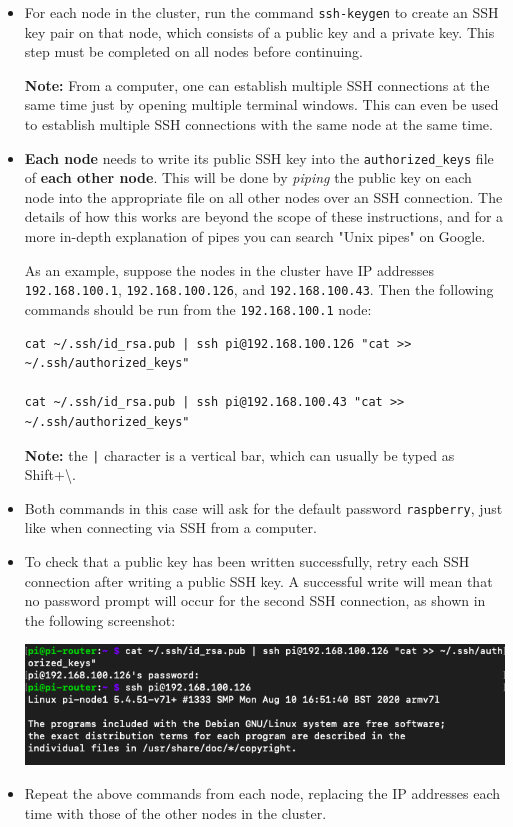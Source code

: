\documentclass{article}
\begin{document}
\begin{itemize}
    \item For each node in the cluster, run the command \texttt{ssh-keygen} to create an SSH key pair on that node, which consists of a public key and a private key. This step must be completed on all nodes before continuing. 
    
    \textbf{Note:} From a computer, one can establish multiple SSH connections at the same time just by opening multiple terminal windows. This can even be used to establish multiple SSH connections with the same node at the same time.

    \item \textbf{Each node} needs to write its public SSH key into the \texttt{authorized\_keys} file of \textbf{each other node}. This will be done by \emph{piping} the public key on each node into the appropriate file on all other nodes over an SSH connection. The details of how this works are beyond the scope of these instructions, and for a more in-depth explanation of pipes you can search "Unix pipes" on Google.
    
    As an example, suppose the nodes in the cluster have IP addresses \texttt{192.168.100.1}, \texttt{192.168.100.126}, and \texttt{192.168.100.43}. Then the following commands should be run from the \texttt{192.168.100.1} node:
    
\begin{verbatim}
cat ~/.ssh/id_rsa.pub | ssh pi@192.168.100.126 "cat >> ~/.ssh/authorized_keys"

cat ~/.ssh/id_rsa.pub | ssh pi@192.168.100.43 "cat >> ~/.ssh/authorized_keys"
\end{verbatim}

    \textbf{Note:} the \texttt{|} character is a vertical bar, which can usually be typed as Shift+\textbackslash.
    
    \item Both commands in this case will ask for the default password \texttt{raspberry}, just like when connecting via SSH from a computer.
    
    \item To check that a public key has been written successfully, retry each SSH connection after writing a public SSH key. A successful write will mean that no password prompt will occur for the second SSH connection, as shown in the following screenshot:
    
    \includegraphics[width=\textwidth]{images/ssh-no-password.png}
    
    \item Repeat the above commands from each node, replacing the IP addresses each time with those of the other nodes in the cluster.
\end{itemize}
\end{document}

